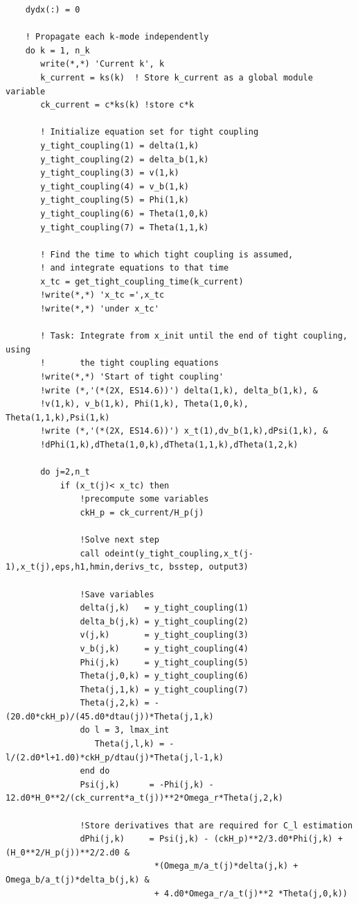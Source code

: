\documentclass[a4paper]{report}
\begin{document}
\begin{verbatim}
    dydx(:) = 0

    ! Propagate each k-mode independently
    do k = 1, n_k
       write(*,*) 'Current k', k
       k_current = ks(k)  ! Store k_current as a global module variable
       ck_current = c*ks(k) !store c*k

       ! Initialize equation set for tight coupling
       y_tight_coupling(1) = delta(1,k)
       y_tight_coupling(2) = delta_b(1,k)
       y_tight_coupling(3) = v(1,k)
       y_tight_coupling(4) = v_b(1,k)
       y_tight_coupling(5) = Phi(1,k)
       y_tight_coupling(6) = Theta(1,0,k)
       y_tight_coupling(7) = Theta(1,1,k)
       
       ! Find the time to which tight coupling is assumed, 
       ! and integrate equations to that time
       x_tc = get_tight_coupling_time(k_current)
       !write(*,*) 'x_tc =',x_tc
       !write(*,*) 'under x_tc'

       ! Task: Integrate from x_init until the end of tight coupling, using
       !       the tight coupling equations
       !write(*,*) 'Start of tight coupling'
       !write (*,'(*(2X, ES14.6))') delta(1,k), delta_b(1,k), &
       !v(1,k), v_b(1,k), Phi(1,k), Theta(1,0,k), Theta(1,1,k),Psi(1,k)
       !write (*,'(*(2X, ES14.6))') x_t(1),dv_b(1,k),dPsi(1,k), &
       !dPhi(1,k),dTheta(1,0,k),dTheta(1,1,k),dTheta(1,2,k)

       do j=2,n_t
           if (x_t(j)< x_tc) then 
               !precompute some variables
               ckH_p = ck_current/H_p(j)

               !Solve next step
               call odeint(y_tight_coupling,x_t(j-1),x_t(j),eps,h1,hmin,derivs_tc, bsstep, output3)

               !Save variables
               delta(j,k)   = y_tight_coupling(1)
               delta_b(j,k) = y_tight_coupling(2)
               v(j,k)       = y_tight_coupling(3)
               v_b(j,k)     = y_tight_coupling(4)
               Phi(j,k)     = y_tight_coupling(5)
               Theta(j,0,k) = y_tight_coupling(6)
               Theta(j,1,k) = y_tight_coupling(7)
               Theta(j,2,k) = -(20.d0*ckH_p)/(45.d0*dtau(j))*Theta(j,1,k)
               do l = 3, lmax_int
                  Theta(j,l,k) = -l/(2.d0*l+1.d0)*ckH_p/dtau(j)*Theta(j,l-1,k)
               end do	
               Psi(j,k)      = -Phi(j,k) - 12.d0*H_0**2/(ck_current*a_t(j))**2*Omega_r*Theta(j,2,k)

               !Store derivatives that are required for C_l estimation
               dPhi(j,k)     = Psi(j,k) - (ckH_p)**2/3.d0*Phi(j,k) + (H_0**2/H_p(j))**2/2.d0 &
                              *(Omega_m/a_t(j)*delta(j,k) + Omega_b/a_t(j)*delta_b(j,k) &
                              + 4.d0*Omega_r/a_t(j)**2 *Theta(j,0,k))


\end{verbatim}
\end{document}
